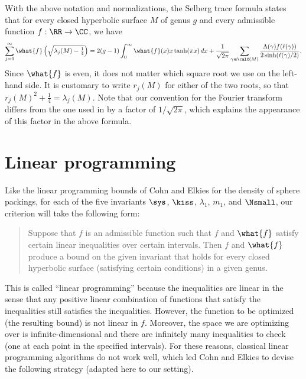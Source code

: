 \documentclass[12pt]{amsart}
\numberwithin{equation}{section}
\begin{document}
With the above notation and normalizations, the Selberg trace formula \cite[Section 9.5]{Buser} states that for every closed hyperbolic surface $M$ of genus $g$ and every admissible function $f:\RR \to \CC$, we have
\begin{equation*}
\sum_{j=0}^\infty \what{f}\left(\textstyle\sqrt{\lambda_j(M)-\frac14}\right) = 2(g-1)\int_0^\infty  \what{f}(x) x \tanh(\pi x) \,dx+ \frac{1}{\sqrt{2\pi}}\sum_{\gamma \in \calC(M)} \frac{\Lambda(\gamma)f(\ell(\gamma))}{2 \sinh(\ell(\gamma)/2)} .
\end{equation*}
Since $\what{f}$ is even, it does not matter which square root we use on the left-hand side. It is customary to write $r_j(M)$ for either of the two roots, so that $r_j(M)^2+\frac14 = \lambda_j(M)$. Note that our convention for the Fourier transform differs from the one used in \cite{Buser} by a factor of $1/\sqrt{2\pi}$, which explains the appearance of this factor in the above formula. 

\section{Linear programming}  \label{sec:CohnElkies}

Like the linear programming bounds of Cohn and Elkies \cite{CohnElkies} for the density of sphere packings, for each of the five invariants $\sys$, $\kiss$, $\lambda_1$, $m_1$, and $\Nsmall$, our criterion will take the following form:
\begin{quotation}
Suppose that $f$ is an admissible function such that $f$ and $\what{f}$ satisfy certain linear inequalities over certain intervals. Then $f$ and $\what{f}$ produce a bound on the given invariant that holds for every closed hyperbolic surface (satisfying certain conditions) in a given genus. 
\end{quotation} 

This is called ``linear programming'' because the inequalities are linear in the sense that any positive linear combination of functions that satisfy the inequalities still satisfies the inequalities. However, the function to be optimized (the resulting bound) is not linear in $f$. Moreover, the space we are optimizing over is infinite-dimensional and there are infinitely many inequalities to check (one at each point in the specified intervals). For these reasons, classical linear programming algorithms do not work well, which led Cohn and Elkies to devise the following strategy (adapted here to our setting). 
\end{document}
